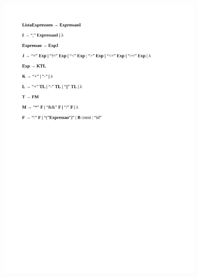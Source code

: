 \begin{figure}[!ht]
	\vspace{0.2cm}
	\includegraphics[width=0.9\textwidth]{figuras/GLC_LL1-2.png}
	 \vspace{0.2cm}
	\label{fig:figura1}
\end{figure}
\vspace{0.2cm}

